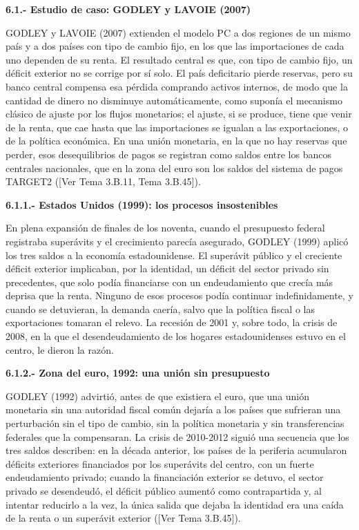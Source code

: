 \documentclass[10pt,a4paper]{article}
\newcommand{\authorfont}[1]{{\fontfamily{EBGaramond-TLF}\selectfont #1}}
\begin{document}
\textbf{6.1.- Estudio de caso: GODLEY y LAVOIE (2007)}

GODLEY y LAVOIE (2007) extienden el modelo PC a dos regiones de un mismo país y a dos países con tipo de cambio fijo, en los que las importaciones de cada uno dependen de su renta. El resultado central es que, con tipo de cambio fijo, un déficit exterior no se corrige por sí solo. El país deficitario pierde reservas, pero su banco central compensa esa pérdida comprando activos internos, de modo que la cantidad de dinero no disminuye automáticamente, como suponía el mecanismo clásico de ajuste por los flujos monetarios; el ajuste, si se produce, tiene que venir de la renta, que cae hasta que las importaciones se igualan a las exportaciones, o de la política económica. En una unión monetaria, en la que no hay reservas que perder, esos desequilibrios de pagos se registran como saldos entre los bancos centrales nacionales, que en la zona del euro son los saldos del sistema de pagos TARGET2 ([\authorfont{Ver Tema 3.B.11, Tema 3.B.45}]).

\textbf{6.1.1.- Estados Unidos (1999): los procesos insostenibles}

En plena expansión de finales de los noventa, cuando el presupuesto federal registraba superávits y el crecimiento parecía asegurado, GODLEY (1999) aplicó los tres saldos a la economía estadounidense. El superávit público y el creciente déficit exterior implicaban, por la identidad, un déficit del sector privado sin precedentes, que solo podía financiarse con un endeudamiento que crecía más deprisa que la renta. Ninguno de esos procesos podía continuar indefinidamente, y cuando se detuvieran, la demanda caería, salvo que la política fiscal o las exportaciones tomaran el relevo. La recesión de 2001 y, sobre todo, la crisis de 2008, en la que el desendeudamiento de los hogares estadounidenses estuvo en el centro, le dieron la razón.

\textbf{6.1.2.- Zona del euro, 1992: una unión sin presupuesto}

GODLEY (1992) advirtió, antes de que existiera el euro, que una unión monetaria sin una autoridad fiscal común dejaría a los países que sufrieran una perturbación sin el tipo de cambio, sin la política monetaria y sin transferencias federales que la compensaran. La crisis de 2010-2012 siguió una secuencia que los tres saldos describen: en la década anterior, los países de la periferia acumularon déficits exteriores financiados por los superávits del centro, con un fuerte endeudamiento privado; cuando la financiación exterior se detuvo, el sector privado se desendeudó, el déficit público aumentó como contrapartida y, al intentar reducirlo a la vez, la única salida que dejaba la identidad era una caída de la renta o un superávit exterior ([\authorfont{Ver Tema 3.B.45}]).
\end{document}

